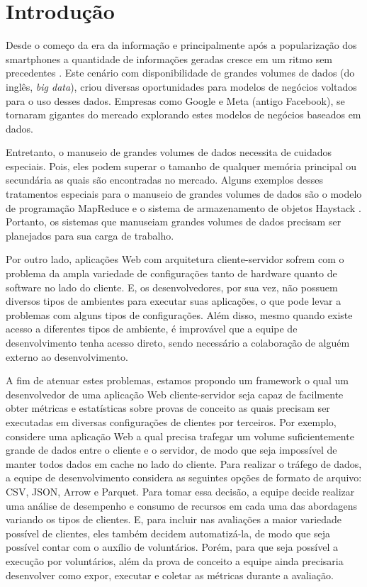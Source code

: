 \documentclass[12pt]{tcc}
\begin{document}
\dtables
	

\justifying
	
\chapter{Introdução}
\label{cap:intro}

Desde o começo da era da informação e principalmente após a popularização dos smartphones a quantidade de informações geradas cresce em um ritmo sem precedentes \citep{Gandomi2015Beyond}.
Este cenário com disponibilidade de grandes volumes de dados (do inglês, \emph{big data}), criou diversas oportunidades para modelos de negócios voltados para o uso desses dados.
Empresas como Google e Meta (antigo Facebook), se tornaram gigantes do mercado explorando estes modelos de negócios baseados em dados.

Entretanto, o manuseio de grandes volumes de dados necessita de cuidados especiais.
Pois, eles podem superar o tamanho de qualquer memória principal ou secundária as quais são encontradas no mercado.
Alguns exemplos desses tratamentos especiais para o manuseio de grandes volumes de dados são o modelo de programação MapReduce \citep{Dean2008MapReduce} e o sistema de armazenamento de objetos Haystack \citep{Beaver2010Finding}.
Portanto, os sistemas que manuseiam grandes volumes de dados precisam ser planejados para sua carga de trabalho.

Por outro lado, aplicações Web com arquitetura cliente-servidor sofrem com o problema da ampla variedade de configurações tanto de hardware quanto de software no lado do cliente.
E, os desenvolvedores, por sua vez, não possuem diversos tipos de ambientes para executar suas aplicações, o que pode levar a problemas com alguns tipos de configurações.
Além disso, mesmo quando existe acesso a diferentes tipos de ambiente, é improvável que a equipe de desenvolvimento tenha acesso direto, sendo necessário a colaboração de alguém externo ao desenvolvimento.

A fim de atenuar estes problemas, estamos propondo um framework o qual um desenvolvedor de uma aplicação Web cliente-servidor seja capaz de facilmente obter métricas e estatísticas sobre provas de conceito as quais precisam ser executadas em diversas configurações de clientes por terceiros.
Por exemplo, considere uma aplicação Web a qual precisa trafegar um volume suficientemente grande de dados entre o cliente e o servidor, de modo que seja impossível de manter todos dados em cache no lado do cliente.
Para realizar o tráfego de dados, a equipe de desenvolvimento considera as seguintes opções de formato de arquivo: CSV, JSON, Arrow e Parquet.
Para tomar essa decisão, a equipe decide realizar uma análise de desempenho e consumo de recursos em cada uma das abordagens variando os tipos de clientes.
E, para incluir nas avaliações a maior variedade possível de clientes, eles também decidem automatizá-la, de modo que seja possível contar com o auxílio de voluntários.
Porém, para que seja possível a execução por voluntários, além da prova de conceito a equipe ainda precisaria desenvolver como expor, executar e coletar as métricas durante a avaliação.
\end{document}

